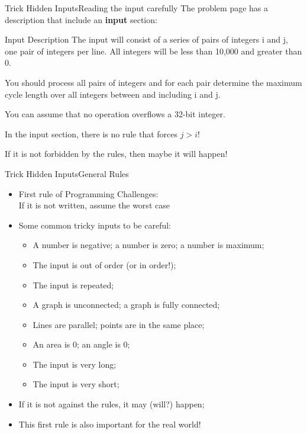 \begin{frame}{Trick Hidden Inputs}{Reading the input carefully}
  The problem page has a description that include an {\bf input} section:

  \begin{block}{Input Description}
    The input will consist of a series of \alert{pairs of integers} i and j, one pair of integers per line. All integers will be \alert{less than 10,000 and greater than 0.}

    \bigskip

    You should process all pairs of integers and for each pair determine the maximum cycle length over \alert{all integers between and including i and j}.
    \bigskip

    You can \alert{assume that no operation overflows a 32-bit integer}.
  \end{block}
  \bigskip

  In the input section, there is no rule that forces $j > i$!
  \medskip

  If it is not forbidden by the rules, then maybe it will happen!
\end{frame}

\begin{frame}{Trick Hidden Inputs}{General Rules}

  \begin{itemize}
    \item First rule of Programming Challenges:\\
      \hspace{1cm}\alert{If it is not written, assume the worst case}
    \bigskip

    \item Some common tricky inputs to be careful:
    \begin{itemize}
      \item A number is negative; a number is zero; a number is maximum;
      \item The input is out of order (or in order!);
      \item The input is repeated;
      \smallskip

      \item A graph is unconnected; a graph is fully connected;
      \item Lines are parallel; points are in the same place;
      \item An area is 0; an angle is 0;
      \smallskip

      \item The input is very long;
      \item The input is very short;
    \end{itemize}
    \bigskip

    \item If it is not against the rules, it may (will?) happen;
    \item This first rule is also important for the real world!
  \end{itemize}
\end{frame}

